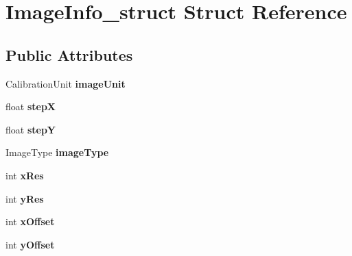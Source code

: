 \hypertarget{structImageInfo__struct}{
\section{ImageInfo\_\-struct Struct Reference}
\label{structImageInfo__struct}
}
\subsection*{Public Attributes}
\begin{DoxyCompactItemize}
\item 
\hypertarget{structImageInfo__struct_a2a1a4b0989752555e25cbe9bc4d8499b}{
CalibrationUnit {\bfseries imageUnit}}
\label{structImageInfo__struct_a2a1a4b0989752555e25cbe9bc4d8499b}

\item 
\hypertarget{structImageInfo__struct_ac42a36590e35b1530263caaa7423cd8b}{
float {\bfseries stepX}}
\label{structImageInfo__struct_ac42a36590e35b1530263caaa7423cd8b}

\item 
\hypertarget{structImageInfo__struct_a423c8c3e3c85ba39f6e9855083e05006}{
float {\bfseries stepY}}
\label{structImageInfo__struct_a423c8c3e3c85ba39f6e9855083e05006}

\item 
\hypertarget{structImageInfo__struct_aa03d23eb7acc971f3be17f0589b82248}{
ImageType {\bfseries imageType}}
\label{structImageInfo__struct_aa03d23eb7acc971f3be17f0589b82248}

\item 
\hypertarget{structImageInfo__struct_acaef5cb1ec4956ac0ae4b06a465502d9}{
int {\bfseries xRes}}
\label{structImageInfo__struct_acaef5cb1ec4956ac0ae4b06a465502d9}

\item 
\hypertarget{structImageInfo__struct_af9a48c8d14020669fb440d1dd5e6199a}{
int {\bfseries yRes}}
\label{structImageInfo__struct_af9a48c8d14020669fb440d1dd5e6199a}

\item 
\hypertarget{structImageInfo__struct_a624e1267359590053aa2b1bab9cc9afc}{
int {\bfseries xOffset}}
\label{structImageInfo__struct_a624e1267359590053aa2b1bab9cc9afc}

\item 
\hypertarget{structImageInfo__struct_ae8a4ed52e0fa780296e9ba40e71ac212}{
int {\bfseries yOffset}}
\label{structImageInfo__struct_ae8a4ed52e0fa780296e9ba40e71ac212}


\end{DoxyCompactItemize}
